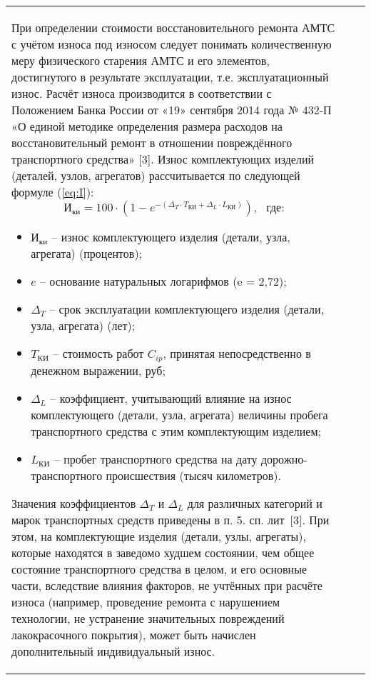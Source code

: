 \begin{longtable}{G{3mm}|M{120mm}|G{30mm}}
\par При определении стоимости восстановительного ремонта АМТС с учётом износа под износом следует понимать количественную меру физического старения АМТС и его элементов, достигнутого в результате эксплуатации, т.е. эксплуатационный износ.
%
Расчёт износа производится в  соответствии с Положением Банка России от «19» сентября 2014 года № 432-П «О единой методике определения размера расходов на восстановительный ремонт в отношении повреждённого транспортного средства» [3].
Износ комплектующих изделий (деталей, узлов, агрегатов) рассчитывается по следующей формуле (\ref{eq:I}):
%
%
%
\begin{equation}\label{eq:I}
\text{И}_{\text{ки}} 
= 100\cdot\left( 1-e^ {-\left( \Delta_{T} \cdot T_{\text{КИ}} + \Delta_{L} \cdot L_{\text{КИ}} \right)}\right), \,\,\,\,\text{где:}   
\end{equation}
%
\begin{itemize}
	\item[ ]$ \text{И}_{\text{ки}} $ -- износ комплектующего изделия (детали, узла, агрегата) (процентов); 
	\item[ ]$ e $ -- основание натуральных логарифмов (e =  2,72);
	\item[ ]$ \Delta_{T}$ --  срок эксплуатации комплектующего изделия (детали, узла, агрегата) (лет);
	\item[ ]$ T_{\text{КИ}} $ -- стоимость работ $ C_{ip} $, принятая непосредственно в денежном выражении, руб;
	\item[ ]$ \Delta_{L} $ -- коэффициент, учитывающий влияние на износ комплектующего (детали, узла, агрегата) величины пробега транспортного средства с этим комплектующим изделием;
	\item[ ]$ L_{\text{КИ}} $ -- пробег транспортного средства на дату дорожно-транспортного происшествия (тысяч километров).  
\end{itemize}
\vspace{5mm}
\par Значения коэффициентов $ \Delta_{T}$  и $ \Delta_{L} $  для различных категорий и марок транспортных средств приведены в п. 5. сп. лит~[3]. При этом, на комплектующие изделия (детали, узлы, агрегаты), которые находятся в заведомо худшем состоянии, чем общее состояние транспортного средства в целом, и его основные части, вследствие влияния факторов, не учтённых при расчёте износа (например, проведение ремонта с нарушением технологии, не устранение значительных повреждений лакокрасочного покрытия), может быть начислен дополнительный индивидуальный износ. 


\end{longtable}
